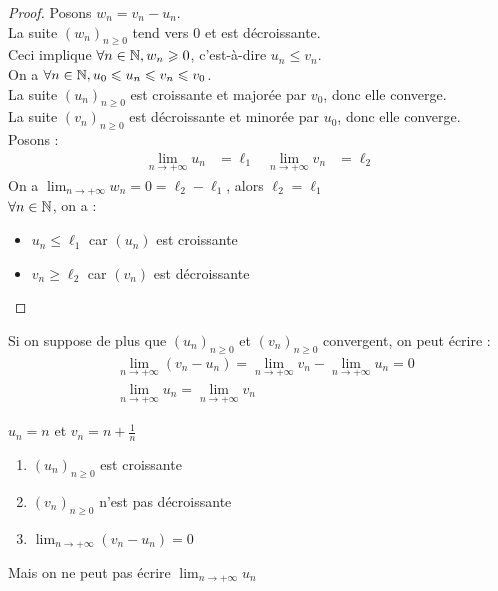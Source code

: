 \begin{proof}
    Posons $w_n = v_n - u_n$. 
    \\
    La suite $(w_n)_{n \geq 0}$ tend vers 0 et est décroissante.
    \\
    Ceci implique $\forall n \in \mathbb{N}, w_n \geqslant 0$, c'est-à-dire $u_n \leq v_n$.
    \\
    On a $\forall n \in \mathbb{N}, u_0 \leqslant u_n \leqslant v_n \leqslant v_0$.
    \\
    La suite $(u_n)_{n \geq 0}$ est croissante et majorée par $v_0$, donc elle converge.
    \\
    La suite $(v_n)_{n \geq 0}$ est décroissante et minorée par $u_0$, donc elle converge.
    \\
    Posons : 
    \begin{align*}
        \lim_{n \to +\infty} u_n &= \ell_1 & \lim_{n \to +\infty} v_n &= \ell_2
    \end{align*}
    On a $\displaystyle{\lim_{n \to +\infty} w_n = 0 = \ell_2 - \ell_1}$, alors $\ell_2 = \ell_1$
    \\
    $\forall n \in \mathbb{N}$, on a :
    \begin{itemize}
        \item $u_n \leq \ell_1$ car $(u_n)$ est croissante
        \item $v_n \geq \ell_2$ car $(v_n)$ est décroissante
    \end{itemize}
\end{proof}

\begin{remarque}
    Si on suppose de plus que $(u_n)_{n \geq 0}$ et $(v_n)_{n \geq 0}$ convergent, on peut écrire :
    \begin{align*}
        &\lim_{n \to +\infty} (v_n - u_n) = \lim_{n \to +\infty} v_n - \lim_{n \to +\infty} u_n = 0 \\
        &\lim_{n \to +\infty} u_n = \lim_{n \to +\infty} v_n 
    \end{align*}
\end{remarque}

\begin{exemple}
    $u_n = n$ et $v_n = n + \frac{1}{n}$
    \begin{enumerate}
        \item $(u_n)_{n \geq 0}$ est croissante
        \item $(v_n)_{n \geq 0}$ n'est pas décroissante
        \item $\lim_{n \to +\infty} (v_n - u_n) = 0$
    \end{enumerate}
    Mais on ne peut pas écrire $\displaystyle{\lim_{n \to +\infty} u_n}$
\end{exemple}

